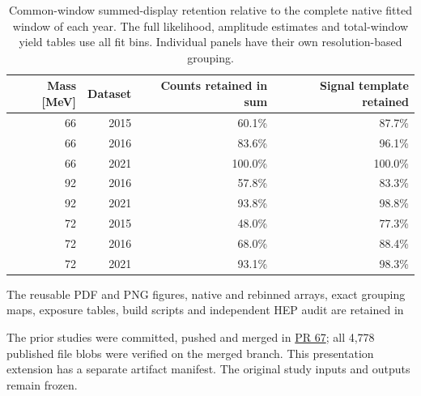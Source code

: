 \begin{table}[H]\centering\small
\begin{tabular}{rrrr}\toprule
Mass [MeV] & Dataset & Counts retained in sum & Signal template retained\\\midrule
66 & 2015 & 60.1\% & 87.7\%\\
66 & 2016 & 83.6\% & 96.1\%\\
66 & 2021 & 100.0\% & 100.0\%\\
92 & 2016 & 57.8\% & 83.3\%\\
92 & 2021 & 93.8\% & 98.8\%\\
72 & 2015 & 48.0\% & 77.3\%\\
72 & 2016 & 68.0\% & 88.4\%\\
72 & 2021 & 93.1\% & 98.3\%\\
\bottomrule\end{tabular}
\caption{Common-window summed-display retention relative to the complete native fitted window of each year. The full likelihood, amplitude estimates and total-window yield tables use all fit bins. Individual panels have their own resolution-based grouping.}\end{table}

The reusable PDF and PNG figures, native and rebinned arrays, exact grouping maps, exposure tables, build scripts and independent HEP audit are retained in
\begin{center}\small{}\end{center}
The prior studies were committed, pushed and merged in \href{https://github.com/EmrysPeets/hps-gpr/pull/67}{PR 67}; all 4,778 published file blobs were verified on the merged branch. This presentation extension has a separate artifact manifest. The original study inputs and outputs remain frozen.
